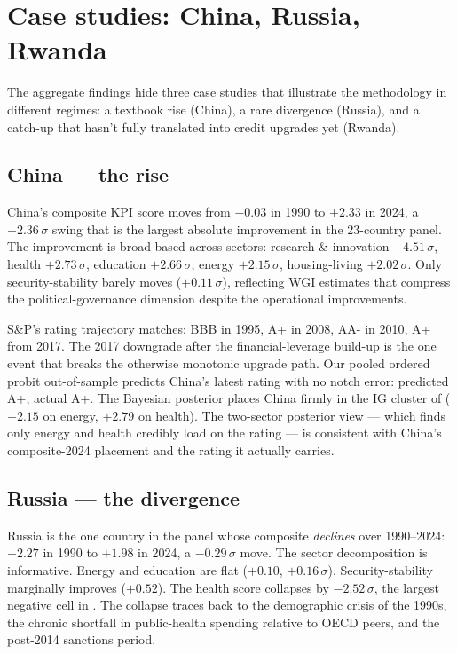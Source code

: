 \section{Case studies: China, Russia, Rwanda}\label{sec:case_studies}

The aggregate findings hide three case studies that illustrate the methodology in different regimes: a textbook rise (China), a rare divergence (Russia), and a catch-up that hasn't fully translated into credit upgrades yet (Rwanda).

\subsection{China --- the rise}

China's composite KPI score moves from $-0.03$ in 1990 to $+2.33$ in 2024, a $+2.36\,\sigma$ swing that is the largest absolute improvement in the 23-country panel. The improvement is broad-based across sectors: research \& innovation $+4.51\,\sigma$, health $+2.73\,\sigma$, education $+2.66\,\sigma$, energy $+2.15\,\sigma$, housing-living $+2.02\,\sigma$. Only security-stability barely moves ($+0.11\,\sigma$), reflecting WGI estimates that compress the political-governance dimension despite the operational improvements.

S\&P's rating trajectory matches: BBB in 1995, A+ in 2008, AA- in 2010, A+ from 2017. The 2017 downgrade after the financial-leverage build-up is the one event that breaks the otherwise monotonic upgrade path. Our pooled ordered probit out-of-sample predicts China's latest rating with no notch error: predicted A+, actual A+. The Bayesian posterior places China firmly in the IG cluster of  ($+2.15$ on energy, $+2.79$ on health). The two-sector posterior view --- which finds only energy and health credibly load on the rating --- is consistent with China's composite-2024 placement and the rating it actually carries.

\subsection{Russia --- the divergence}

Russia is the one country in the panel whose composite \emph{declines} over 1990--2024: $+2.27$ in 1990 to $+1.98$ in 2024, a $-0.29\,\sigma$ move. The sector decomposition is informative. Energy and education are flat ($+0.10$, $+0.16\,\sigma$). Security-stability marginally improves ($+0.52$). The health score collapses by $-2.52\,\sigma$, the largest negative cell in . The collapse traces back to the demographic crisis of the 1990s, the chronic shortfall in public-health spending relative to OECD peers, and the post-2014 sanctions period.

